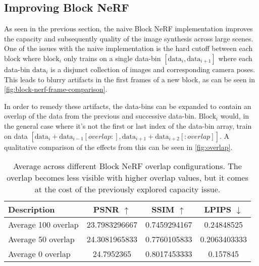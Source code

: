 \subsection{Improving Block NeRF}
As seen in the previous section, the naive Block NeRF implementation improves the capacity and subsequently quality of the image synthesis across large scenes. One of the issues with the naive implementation is the hard cutoff between each block where $\text{block}_i$ only trains on a single data-bin $[\text{data}_i, \text{data}_{i + 1}]$ where each data-bin $\text{data}_i$ is a disjunct collection of images and corresponding camera poses. This leads to blurry artifacts in the first frames of a new block, as can be seen in \autoref{fig:block-nerf-frame-comparison}.



In order to remedy these artifacts, the data-bins can be expanded to contain an overlap of the data from the previous and successive data-bin. $\text{Block}_i$ would, in the general case where it's not the first or last index of the data-bin array, train on data $[\text{data}_i + \text{data}_{i-1}[overlap:], \text{data}_{i + 1} + \text{data}_{i+2}[:overlap]]$. A qualitative comparison of the effects from this can be seen in \autoref{fig:overlap}.



\begin{table}[ht]
\centering
\setlength{\tabcolsep}{6pt}
\renewcommand{\arraystretch}{1.5}
\begin{tabular}{l | C{2.2} C{1.3} C{1.3}}
\hline
\textbf{Description} & \textbf{PSNR $\uparrow$} & \textbf{SSIM $\uparrow$} & \textbf{LPIPS $\downarrow$} \\
\hline
Average 100 overlap &23.7983296667 &0.7459294167 &0.24848525 \\
Average 50 overlap & 24.3081965833 & 0.7760105833 & 0.2063403333 \\
Average 0 overlap &24.7952365 &0.8017453333 &0.157845 \\
\hline
\end{tabular}
\caption{Average across different Block NeRF overlap configurations. The overlap becomes less visible with higher overlap values, but it comes at the cost of the previously explored capacity issue.}
\label{tab:block-nerf-overlap-comparison}
\end{table}


